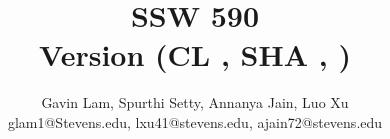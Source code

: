 %

\begin{titlepage}
        \title{SSW 590 \\ Version \buildnum{} (CL \changelist{}, SHA \changeset{}, \builddate{})}
        \author{Gavin Lam, Spurthi Setty, Annanya Jain, Luo Xu \\ glam1@Stevens.edu, lxu41@stevens.edu, ajain72@stevens.edu}
        \conferraldate{}{\today} \maketitle
\end{titlepage}

\makecopyright

\begin{abstract}
\end{abstract}


% 


\contentspage

\tablelistpage

\figurelistpage